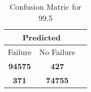 \begin{table}[] 
\caption{Confusion Matric for 99.5} 
\label{Table: Prediction Accuracy-DMD99.5OnlySunEKF-combinationReflection-Reflection} 
\centering 
\begin{tabular} 
 {@{}ccc@{}} 
\toprule 
\multicolumn{2}{c}{\textbf{Predicted}}
 \\ \midrule 
\multicolumn{1}{|c|}{Failure} & 
\multicolumn{1}{c|}{No Failure}
 \\ \midrule 
\multicolumn{1}{|c|}{\color{green}\textbf{94575}} & 
\multicolumn{1}{c|}{\color{red}\textbf{427}}
 \\ \midrule 
\multicolumn{1}{|c|}{\color{red}\textbf{371}} & 
\multicolumn{1}{c|}{\color{green}\textbf{74755}}
 \\ \bottomrule 
\end{tabular} 
\end{table} 
